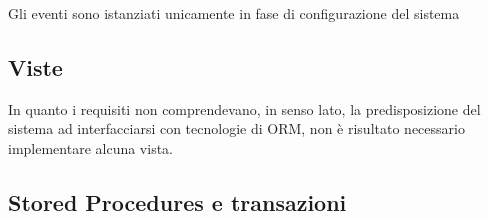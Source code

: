 Gli eventi sono istanziati unicamente in fase di configurazione del sistema


\pagebreak
{}

\subsection*{Viste}
%
%

In quanto i requisiti non comprendevano, in senso lato, la predisposizione
del sistema ad interfacciarsi con tecnologie di ORM, non è risultato necessario
implementare alcuna vista.

\pagebreak

\subsection*{Stored Procedures e transazioni}
%
%

